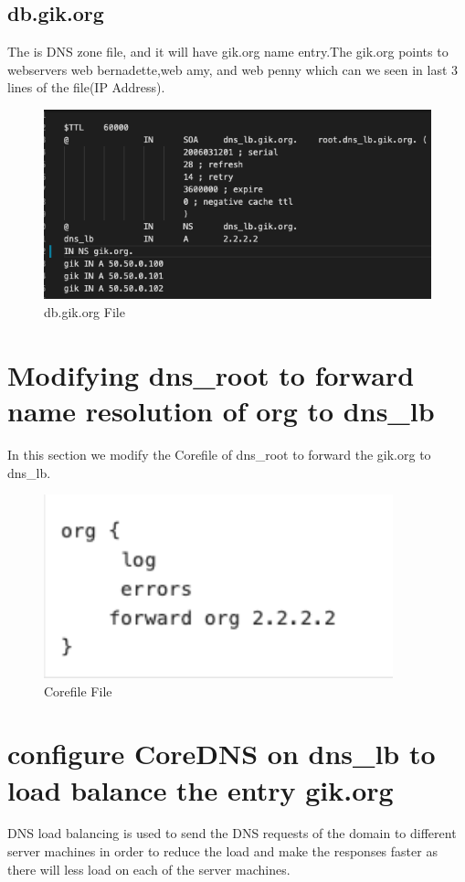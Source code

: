 \subsection{db.gik.org}
The is DNS zone file, and it will have gik.org name entry.The gik.org points to webservers web bernadette,web amy, and web penny which can we seen in last 3 lines of the file(IP Address).
 \begin{figure}[H]
\centering
  \includegraphics[width=1.2\textwidth]{Images/db.gik.org.png}
  \caption{db.gik.org File }
  \label{fig:2.11}
\end{figure}
\section{Modifying dns\_root to forward name resolution of org to dns\_lb}
In this section we modify the Corefile of dns\_root to forward the gik.org to dns\_lb. 
\begin{figure}[H]
\centering
  \includegraphics[width=0.9\textwidth]{Images/Forward gik.org to dns_lb.png}
  \caption{Corefile File }
  \label{fig:2.12}
\end{figure}
\section{configure CoreDNS on dns\_lb to load balance the entry gik.org}
DNS load balancing is used to send the DNS requests of the domain to different server machines in order to reduce the load and make the responses faster as there will less load on each of the server machines.
